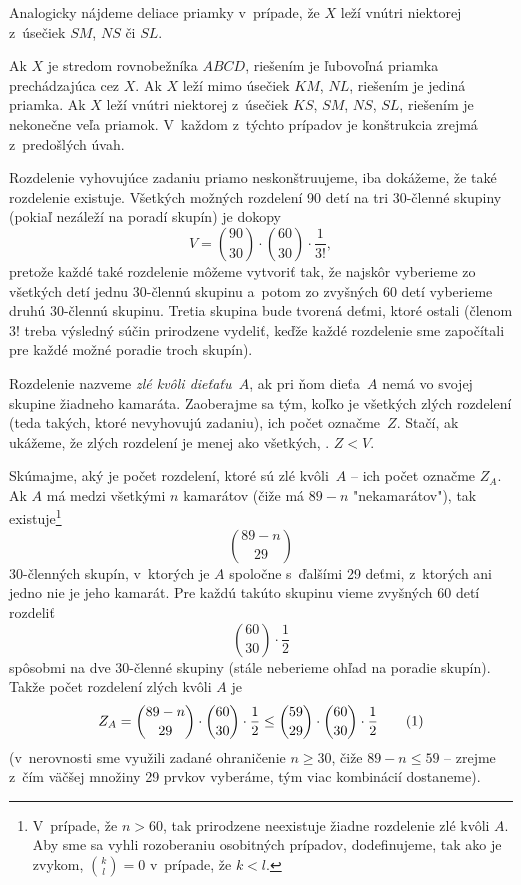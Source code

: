 {Analogicky nájdeme deliace priamky v~prípade, že $X$ leží vnútri niektorej z~úsečiek $SM$, $NS$ či $SL$.

\zaver
Ak $X$ je stredom rovnobežníka $ABCD$, riešením je ľubovoľná priamka prechádzajúca cez $X$. Ak $X$ leží mimo úsečiek $KM$, $NL$, riešením je jediná priamka. Ak $X$ leží vnútri niektorej z~úsečiek $KS$, $SM$, $NS$, $SL$, riešením je nekonečne veľa priamok. V~každom z~týchto prípadov je konštrukcia zrejmá z~predošlých úvah.
}

{%
Rozdelenie vyhovujúce zadaniu priamo neskonštruujeme, iba dokážeme, že také rozdelenie existuje. Všetkých možných rozdelení 90 detí na tri 30-členné skupiny (pokiaľ nezáleží na poradí skupín) je dokopy
$$
V={90\choose 30}\cdot {60\choose 30}\cdot\frac1{3!},
$$
pretože každé také rozdelenie môžeme vytvoriť tak, že najskôr vyberieme zo všetkých detí jednu 30-člennú skupinu a~potom zo zvyšných 60 detí vyberieme druhú 30-člennú skupinu. Tretia skupina bude tvorená deťmi, ktoré ostali (členom $3!$ treba výsledný súčin prirodzene vydeliť, keďže každé rozdelenie sme započítali pre každé možné poradie troch skupín).

Rozdelenie nazveme {\it zlé kvôli dieťaťu~$A$}, ak pri ňom dieťa~$A$ nemá vo svojej skupine žiadneho kamaráta. Zaoberajme sa tým, koľko je všetkých zlých rozdelení (teda takých, ktoré nevyhovujú zadaniu), ich počet označme~$Z$. Stačí, ak ukážeme, že zlých rozdelení je menej ako všetkých, \tj. $Z<V$.

Skúmajme, aký je počet rozdelení, ktoré sú zlé kvôli~$A$ -- ich počet označme $Z_A$. Ak $A$ má medzi všetkými $n$ kamarátov (čiže má $89-n$ "nekamarátov"), tak existuje\footnote{V~prípade, že $n>60$, tak prirodzene neexistuje žiadne rozdelenie zlé kvôli $A$. Aby sme sa vyhli rozoberaniu osobitných prípadov, dodefinujeme, tak ako je zvykom,  ${k\choose l}=0$ v~prípade, že $k<l$.}
$$
{89-n\choose 29}
$$
30-členných skupín, v~ktorých je $A$ spoločne s~ďalšími 29 deťmi, z~ktorých ani jedno nie je jeho kamarát. Pre každú takúto skupinu vieme zvyšných 60 detí rozdeliť
$$
{60\choose 30}\cdot\frac12
$$
spôsobmi na dve 30-členné skupiny (stále neberieme ohľad na poradie skupín). Takže počet rozdelení zlých kvôli $A$ je
$$
Z_A={89-n\choose 29}\cdot{60\choose 30}\cdot\frac12\le{59\choose 29}\cdot{60\choose 30}\cdot\frac12
\tag1
$$
(v~nerovnosti sme využili zadané ohraničenie $n\ge30$, čiže $89-n\le59$ -- zrejme z~čím väčšej množiny 29 prvkov vyberáme, tým viac kombinácií dostaneme).

}
